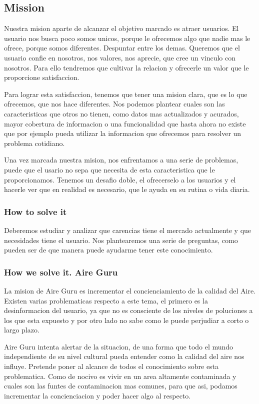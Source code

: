 \subsection{Mission}
Nuestra mision aparte de alcanzar el objetivo marcado es atraer usuarios.
El usuario nos busca poco somos unicos, porque le ofrecemos algo que
nadie mas le ofrece, porque somos diferentes. Despuntar entre los demas.
Queremos que el usuario confie en nosotros, nos valores, nos aprecie, que cree un vinculo con nosotros. Para
ello tendremos que cultivar la relacion y ofrecerle un valor que le proporcione satisfaccion.
 
Para lograr esta satisfaccion, tenemos que tener una mision clara, que es lo que ofrecemos, que nos hace diferentes.
Nos podemos plantear cuales son las caracteristicas que otros no tienen, como datos mas actualizados y acurados, 
mayor cobertura de informacion o una funcionalidad que hasta ahora no existe que por ejemplo pueda utilizar la 
informacion que ofrecemos para resolver un problema cotidiano.

Una vez marcada nuestra mision, nos enfrentamos a una serie de problemas, puede que el usario no sepa que 
necesita de esta caracteristica que le proporcionamos. Tenemos un desafio doble, el ofrecerselo a los usuarios y 
el hacerle ver que en realidad es necesario, que le ayuda en su rutina o vida diaria.


\subsubsection{How to solve it} 
Deberemos estudiar y analizar que carencias tiene el mercado actualmente y que necesidades tiene el usuario.
Nos plantearemos una serie de preguntas, como pueden ser de que manera puede ayudarme tener este conocimiento.

\subsubsection{How we solve it. Aire Guru} 
La mision de Aire Guru es incrementar el concienciamiento de la calidad del Aire. 
Existen varias problematicas respecto a este tema, el primero es la desinformacion del usuario, ya que no es 
consciente de los niveles de poluciones a los que esta expuesto y por otro lado no sabe como le puede perjudiar
a corto o largo plazo.

Aire Guru intenta alertar de la situacion, de una forma que todo el mundo independiente de su nivel cultural 
pueda entender como la calidad del aire nos influye. Pretende poner al alcance de todos el conocimiento sobre
esta problematica. Como de nocivo es vivir en un area altamente contaminada y cuales son las funtes de contaminacion
mas comunes, para que asi, podamos incrementar la concienciacion y poder hacer algo al respecto.


